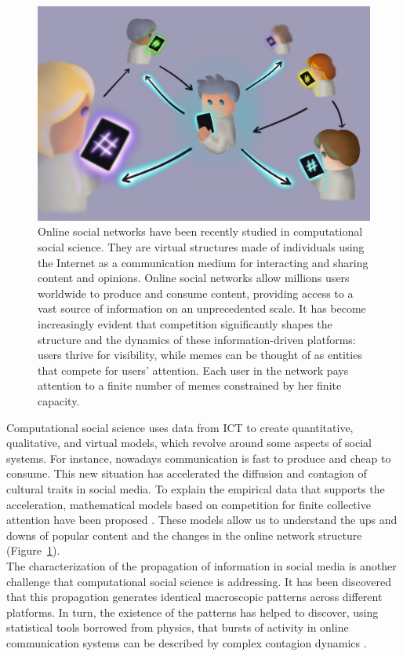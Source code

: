 \begin{figure}[t]
     \centering
\includegraphics[width=0.8\columnwidth]{figures/methods/fig_neutral.pdf}
 \caption[Online social network dynamics]{Online social networks have been recently studied in computational social science. They are virtual structures made of individuals using the Internet as a communication medium for interacting and sharing content and opinions. Online social networks allow millions 
users worldwide to produce and consume content, providing
access to a vast source of information on an unprecedented
scale. It has become increasingly evident that
competition significantly shapes the structure and the dynamics of these information-driven platforms: users thrive
for visibility, while memes can be thought of as entities that
compete for users’ attention. Each user in the network pays
attention to a finite number of memes constrained by her finite capacity.}
\label{chp:methods:fig:neutral}
\end{figure}

Computational social science uses data from ICT to create quantitative, qualitative, and virtual models, which revolve around some aspects of social systems. For instance, nowadays communication is fast to produce and cheap to consume. This new situation has accelerated the diffusion and contagion of cultural traits in social media. To explain the empirical data that supports the acceleration, mathematical models based on competition for finite collective attention have been proposed \cite{palazzi2021ecological,lorenz2019accelerating}. These models allow us to understand the ups and downs of popular
content and the changes in the online network structure (Figure~\ref{chp:methods:fig:neutral}). \\

The characterization of the propagation of information in social media is another challenge that computational social science is addressing.  It has been discovered that this propagation generates identical macroscopic patterns across different platforms. In turn, the existence of the patterns has helped to discover, using statistical tools borrowed from physics, that bursts of activity in online communication systems can be described by complex contagion dynamics \cite{notarmuzi2022universality}.\\

